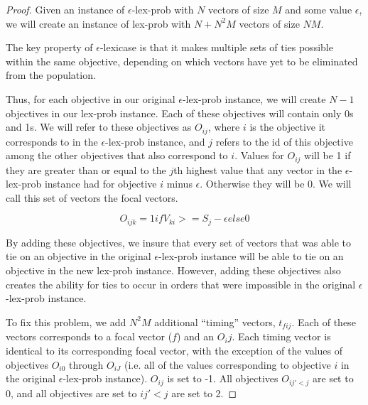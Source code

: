 \documentclass[sigconf]{acmart}
\begin{document}
\begin{proof}

Given an instance of {\sc $\epsilon$-lex-prob} with $N$ vectors of size $M$ and some value $\epsilon$, we will create an instance of {\sc lex-prob} with $N + N^2M$ vectors of size $NM$. %
  
The key property of $\epsilon$-lexicase is that it makes multiple sets of ties possible within the same objective, depending on which vectors have yet to be eliminated from the population.

Thus, for each objective in our original {\sc $\epsilon$-lex-prob} instance, we will create $N-1$ objectives in our {\sc lex-prob} instance. Each of these objectives will contain only 0s and 1s. We will refer to these objectives as $O_{ij}$, where $i$ is the objective it corresponds to in the {\sc $\epsilon$-lex-prob} instance, and $j$ refers to the id of this objective among the other objectives that also correspond to $i$. Values for $O_{ij}$ will be 1 if they are greater than or equal to the $j$th highest value that any vector in the {\sc $\epsilon$-lex-prob} instance had for objective $i$ minus $\epsilon$. Otherwise they will be 0. We will call this set of vectors the focal vectors.


\begin{equation}
O_{ijk} = 1 if V_{ki} >= S_j - \epsilon else 0
\end{equation}

By adding these objectives, we insure that every set of vectors that was able to tie on an objective in the original {\sc $\epsilon$-lex-prob} instance will be able to tie on an objective in the new {\sc lex-prob} instance. However, adding these objectives also creates the ability for ties to occur in orders that were impossible in the original {\sc $\epsilon$-lex-prob} instance.

To fix this problem, we add $N^2M$ additional ``timing'' vectors, $t_{fij}$. Each of these vectors corresponds to a focal vector ($f$) and an $O_ij$. Each timing vector is identical to its corresponding focal vector, with the exception of the values of objectives $O_{i0}$ through $O_{iJ}$ (i.e. all of the values corresponding to objective $i$ in the original {\sc $\epsilon$-lex-prob} instance). $O_{ij}$ is set to -1. All objectives $O_{ij'<j}$ are set to 0, and all objectives are set to ${ij'<j}$ are set to 2.


\end{proof}
\end{document}
